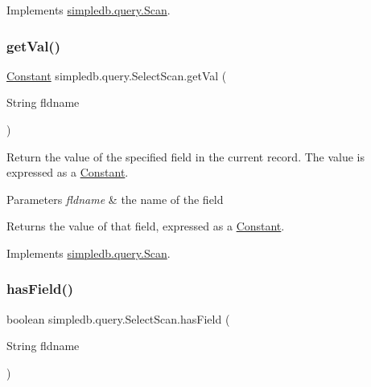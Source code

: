 Implements \hyperlink{interfacesimpledb_1_1query_1_1Scan_a922e219fee53ecfa6163525f9e3ef222}{simpledb.\+query.\+Scan}.

\mbox{\label{classsimpledb_1_1query_1_1SelectScan_a5e5fcf6179ecbbb316e6fde68a04dc7f}} 
\subsubsection{\texorpdfstring{get\+Val()}{getVal()}}
{\footnotesize\ttfamily \hyperlink{classsimpledb_1_1query_1_1Constant}{Constant} simpledb.\+query.\+Select\+Scan.\+get\+Val (\begin{DoxyParamCaption}\item[{String}]{fldname }\end{DoxyParamCaption})\hspace{0.3cm}{\ttfamily [inline]}}

Return the value of the specified field in the current record. The value is expressed as a \hyperlink{classsimpledb_1_1query_1_1Constant}{Constant}. 
\begin{DoxyParams}{Parameters}
{\em fldname} & the name of the field \\
\hline
\end{DoxyParams}
\begin{DoxyReturn}{Returns}
the value of that field, expressed as a \hyperlink{classsimpledb_1_1query_1_1Constant}{Constant}. 
\end{DoxyReturn}


Implements \hyperlink{interfacesimpledb_1_1query_1_1Scan_aca80bca2857c983a88834bf6c01ee5ca}{simpledb.\+query.\+Scan}.

\mbox{\label{classsimpledb_1_1query_1_1SelectScan_ab96fcae15d9b956cddd234ae1cbe84e7}} 
\subsubsection{\texorpdfstring{has\+Field()}{hasField()}}
{\footnotesize\ttfamily boolean simpledb.\+query.\+Select\+Scan.\+has\+Field (\begin{DoxyParamCaption}\item[{String}]{fldname }\end{DoxyParamCaption})\hspace{0.3cm}{\ttfamily [inline]}}

